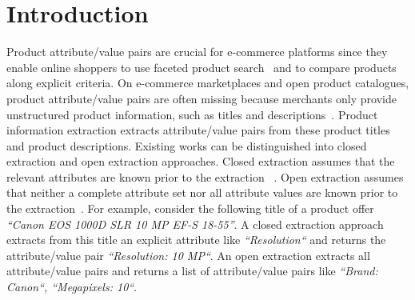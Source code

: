 \section{Introduction}
\label{sec:introduction}

Product attribute/value pairs are crucial for e-commerce platforms since they enable online shoppers to use faceted product search~\cite{wei_survey_2013} and to compare products along explicit criteria. 
On e-commerce marketplaces and open product catalogues, product attribute/value pairs are often missing because merchants only provide unstructured product information, such as titles and descriptions~\cite{yang_mave_2022,zheng_opentag_2018}.
Product information extraction extracts attribute/value pairs from these product titles and product descriptions.
Existing works can be distinguished into closed extraction and open extraction approaches. Closed extraction assumes that the relevant attributes are known prior to the extraction ~\cite{yang_mave_2022, zheng_opentag_2018, zhu_multimodal_2020, xu_scaling_2019, wang_learning_2020}. Open extraction assumes that neither a complete attribute set nor all attribute values are known prior to the extraction~\cite{zhang_oa-mine_2022}. 
For example, consider the following title of a product offer \emph{``Canon EOS 1000D SLR 10 MP EF-S 18-55''}. A closed extraction approach extracts from this title an explicit attribute like \emph{``Resolution``} and returns the attribute/value pair \emph{``Resolution: 10 MP``}. An open extraction extracts all attribute/value pairs and returns a list of attribute/value pairs like \emph{``Brand: Canon``, ``Megapixels: 10``}.

